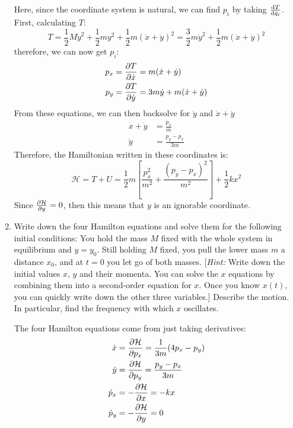 \documentclass[10pt]{article}
\begin{document}
\begin{enumerate}[label=\alph*)]
			\begin{solution}
				Here, since the coordinate system is natural, we can find $p_i$ by taking $\dv{T}{\dot q_i}$. 
				First, calculating $T$:
				\[
				T = \frac{1}{2}M \dot y^2 + \frac{1}{2}my^2 + \frac{1}{2}m(\dot x + \dot y)^2 =
				\frac{3}{2}m\dot y^2 + \frac{1}{2}m(\dot x + \dot y)^2
				\] 
				therefore, we can now get $p_i$: 
				\begin{align*}
					p_x &= \pdv{T}{\dot x} = m(\dot x + \dot y)\\
					p_y &= \pdv{T}{\dot y} = 3m \dot y + m(\dot x + \dot y)
				\end{align*}	
				From these equations, we can then backsolve for $\dot y$ and $\dot x + \dot y$ 
				\begin{align*}
					\dot x + \dot y &= \frac{p_x}{m}\\
					\dot y &= \frac{p_y - p_x}{3m}
				\end{align*} 
				Therefore, the Hamiltonian written in these coordinates is:
				\[
					\mathcal H = T + U = \frac{1}{2}m\left[ \frac{p_x^2}{m^2} + \frac{(p_y - p_x)^2}{m^2}\right] 
					+ \frac{1}{2}kx^2
				\] 
				Since $\pdv{\mathcal H}{y} = 0$, then this means that $y$ is an ignorable coordinate. 
			\end{solution}
		\item Write down the four Hamilton equations and solve them for the following initial conditions: You
			hold the mass $M$ fixed with the whole system in equilibrium and $y = y_0$. Still holding $M$ fixed,
			you pull the lower mass $m$ a distance $x_0$, and at $t = 0$ you let go of both masses. 
			[\textit{Hint:} Write down the initial values $x$, $y$ and their momenta. You can solve the $x$ 
			equations by combining them into a second-order equation for $x$. Once you know $x(t)$, you can 
			quickly write down the other three variables.] Describe the motion. In particular, find the frequency
			with which $x$ oscillates. 


			\begin{solution}
				The four Hamilton equations come from just taking derivatives:
				\begin{align*}
					\dot x &= \pdv{\mathcal H}{p_x} = \frac{1}{3m}(4p_x - p_y)\\
					\dot y &= \pdv{\mathcal H}{p_y} = \frac{p_y - p_x}{3m}\\
					\dot p_x &= -\pdv{\mathcal H}{ x} = -kx\\
					\dot p_y &= -\pdv{\mathcal H}{y} = 0
				\end{align*}


\end{solution}
\end{enumerate}
\end{document}
